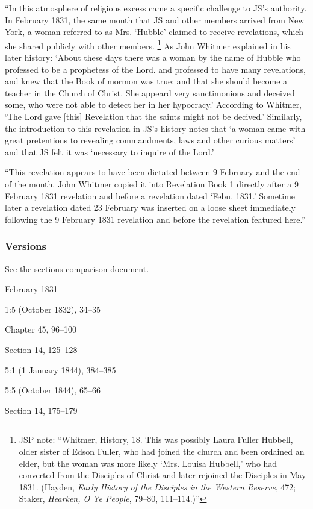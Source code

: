 			``In this atmosphere of religious excess came a specific challenge to JS's authority. In February 1831, the same month that JS and other members arrived from New York, a woman referred to as Mrs. `Hubble' claimed to receive revelations, which she shared publicly with other members.%
				\footnote{%
					JSP note: ``Whitmer, History, 18. This was possibly Laura Fuller Hubbell, older sister of Edson Fuller, who had joined the church and been ordained an elder, but the woman was more likely `Mrs. Louisa Hubbell,' who had converted from the Disciples of Christ and later rejoined the Disciples in May 1831. (Hayden, \textit{Early History of the Disciples in the Western Reserve}, 472; Staker, \textit{Hearken, O Ye People}, 79--80, 111--114.)''
					}
			As John Whitmer explained in his later history: `About these days there was a woman by the name of Hubble who professed to be a prophetess of the Lord. and professed to have many revelations, and knew that the Book of mormon was true; and that she should become a teacher in the Church of Christ. She appeard very sanctimonious and deceived some, who were not able to detect her in her hypocracy.' According to Whitmer, `The Lord gave [this] Revelation that the saints might not be decived.' Similarly, the introduction to this revelation in JS's history notes that `a woman came with great pretentions to revealing commandments, laws and other curious matters' and that JS felt it was `necessary to inquire of the Lord.'
			
			``This revelation appears to have been dictated between 9 February and the end of the month. John Whitmer copied it into Revelation Book 1 directly after a 9 February 1831 revelation and before a revelation dated `Febu. 1831.' Sometime later a revelation dated 23 February was inserted on a loose sheet immediately following the 9 February 1831 revelation and before the revelation featured here.''
			
	\subsubsection{Versions}
		\label{DC43-V}
		
		See the \href{https://drive.google.com/file/d/1goAvNz8jS4R8slYfMG_db55Ty2z_vmgK/view?usp=sharing}{sections comparison} document.
	
		\begin{compactdesc}
			\item[JSP] \hyperref[EMS-1831-JS-FEB-1831-A]{February 1831}
			\item[EMS] 1:5 (October 1832), 34--35
			\item[BC] Chapter 45, 96--100
			\item[DC 1835] Section 14, 125--128
			\item[TS] 5:1 (1 January 1844), 384--385
			\item[MS] 5:5 (October 1844), 65--66
			\item[DC 1844] Section 14, 175--179
		\end{compactdesc}

